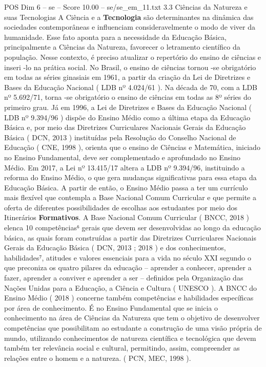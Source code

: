 \begin{textsample}{POS Dim 6 – se – Score 10.00 – se/se\_em\_11.txt}  \label{ex:f6_pos_043}
3.3 Ciências da Natureza e suas Tecnologias A Ciência e a \textbf{Tecnologia} são determinantes na dinâmica das sociedades contemporâneas e influenciam consideravelmente o modo de viver da humanidade.
Esse fato aponta para a necessidade da Educação Básica, principalmente a Ciências da Natureza, favorecer o letramento científico da população.
Nesse contexto, é preciso atualizar o repertório do ensino de ciências e inseri -lo na prática social.
No Brasil, o ensino de ciências tornou -se obrigatório em todas as séries ginasiais em 1961, a partir da criação da Lei de Diretrizes e Bases da Educação Nacional ( LDB nº 4.024/61 ).
Na década de 70, com a LDB nº 5.692/71, torna -se obrigatório o ensino de ciências em todas as 8º séries do primeiro grau.
Já em 1996, a Lei de Diretrizes e Bases da Educação Nacional ( LDB nº 9.394/96 ) dispõe do Ensino Médio como a última etapa da Educação Básica e, por meio das Diretrizes Curriculares Nacionais Gerais da Educação Básica ( DCN, 2013 ) instituídas pela Resolução do Conselho Nacional de Educação ( CNE, 1998 ), orienta que o ensino de Ciências e Matemática, iniciado no Ensino Fundamental, deve ser complementado e aprofundado no Ensino Médio.
Em 2017, a Lei nº 13.415/17 altera a LDB nº 9.394/96, instituindo a reforma do Ensino Médio, o que gera mudanças significativas para essa etapa da Educação Básica.
A partir de então, o Ensino Médio passa a ter um currículo mais flexível que contempla a Base Nacional Comum Curricular e que permite a oferta de diferentes possibilidades de escolhas aos estudantes por meio dos Itinerários \textbf{Formativos}.
A Base Nacional Comum Curricular ( BNCC, 2018 ) elenca 10 competências⁶ gerais que devem ser desenvolvidas ao longo da educação básica, as quais foram construídas a partir das Diretrizes Curriculares Nacionais Gerais da Educação Básica ( DCN, 2013 ; 2018 ) e dos conhecimentos, habilidades⁷, atitudes e valores essenciais para a vida no século XXI segundo o que preconiza os quatro pilares da educação – aprender a conhecer, aprender a fazer, aprender a conviver e aprender a ser – definidos pela Organização das Nações Unidas para a Educação, a Ciência e Cultura ( UNESCO ).
A BNCC do Ensino Médio ( 2018 ) concerne também competências e habilidades específicas por área de conhecimento.
É no Ensino Fundamental que se inicia o conhecimento na área de Ciências da Natureza que tem o objetivo de desenvolver competências que possibilitam ao estudante a construção de uma visão própria de mundo, utilizando conhecimentos de natureza científica e tecnológica que devem também ter relevância social e cultural, permitindo, assim, compreender as relações entre o homem e a natureza. ( PCN, MEC, 1998 ).

\end{textsample}
